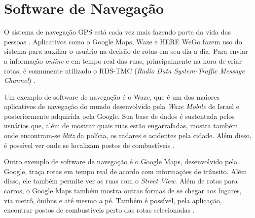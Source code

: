 \section{Software de Navegação}

O sistema de navegação GPS está cada vez mais fazendo parte da vida das pessoas \cite{gps-1}. Aplicativos como o Google Maps, Waze e HERE WeGo fazem uso do sistema para auxiliar o usuário na decisão de rotas em seu dia a dia. Para enviar a informação \textit{online} e em tempo real das ruas, principalmente na hora de criar rotas, é comumente utilizado o RDS-TMC (\textit{Radio Data System-Traffic Message Channel}) \cite{rds-tmc}.

Um exemplo de software de navegação é o Waze, que é um dos maiores aplicativos de navegação do mundo desenvolvido pela \textit{Waze Mobile} de Israel e posteriormente adquirida pela Google. Sua base de dados é sustentada pelos usuários que, além de mostrar quais ruas estão engarrafadas, mostra também onde encontram-se \textit{blitz} da polícia, os radares e acidentes pela cidade. Além disso, é possível ver onde se localizam postos de combustíveis \cite{waze}.

Outro exemplo de software de navegação é o Google Maps, desenvolvido pela Google, traça rotas em tempo real de acordo com informações de trânsito. Além disso, ele também permite ver as ruas com o \textit{Street View}. Além de rotas para carros, o Google Maps também mostra outras formas de se chegar aos lugares, via metrô, ônibus e até mesmo a pé. Também é possível, pela aplicação, encontrar postos de combustíveis perto das rotas selecionadas \cite{google-maps}.
